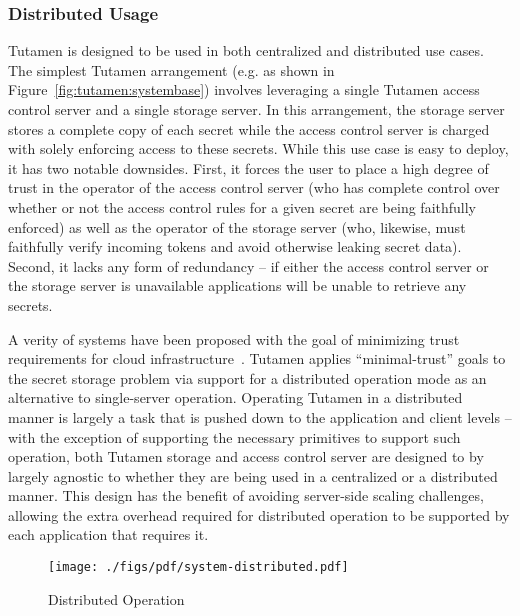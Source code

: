 \subsubsection{Distributed Usage}
\label{sec:tutamen:arch:distributed}

Tutamen is designed to be used in both centralized and distributed use
cases. The simplest Tutamen arrangement (e.g. as shown in
Figure~\ref{fig:tutamen:systembase}) involves leveraging a single
Tutamen access control server and a single storage server. In this
arrangement, the storage server stores a complete copy of each secret
while the access control server is charged with solely enforcing access
to these secrets. While this use case is easy to deploy, it has two
notable downsides. First, it forces the user to place a high degree of
trust in the operator of the access control server (who has complete
control over whether or not the access control rules for a given
secret are being faithfully enforced) as well as the operator of the
storage server (who, likewise, must faithfully verify incoming tokens
and avoid otherwise leaking secret data). Second, it lacks any form of
redundancy -- if either the access control server or the storage server
is unavailable applications will be unable to retrieve any secrets.

A verity of systems have been proposed with the goal of minimizing
trust requirements for cloud infrastructure~\cite{bessani2011,
  kallahalla2003, kubiatowicz2000, mahajan2011,
  wilcox-o'hearn2008}. Tutamen applies ``minimal-trust'' goals to the
secret storage problem via support for a distributed operation mode as
an alternative to single-server operation. Operating Tutamen in a
distributed manner is largely a task that is pushed down to the
application and client levels -- with the exception of supporting the
necessary primitives to support such operation, both Tutamen storage
and access control server are designed to by largely agnostic to
whether they are being used in a centralized or a distributed
manner. This design has the benefit of avoiding server-side scaling
challenges, allowing the extra overhead required for distributed
operation to be supported by each application that requires it.

\begin{figure}[th]
  \centering
  \texttt{[image: ./figs/pdf/system-distributed.pdf]}
  \caption{Distributed Operation}
  \label{fig:tutamen:systemdistributed}
\end{figure}

